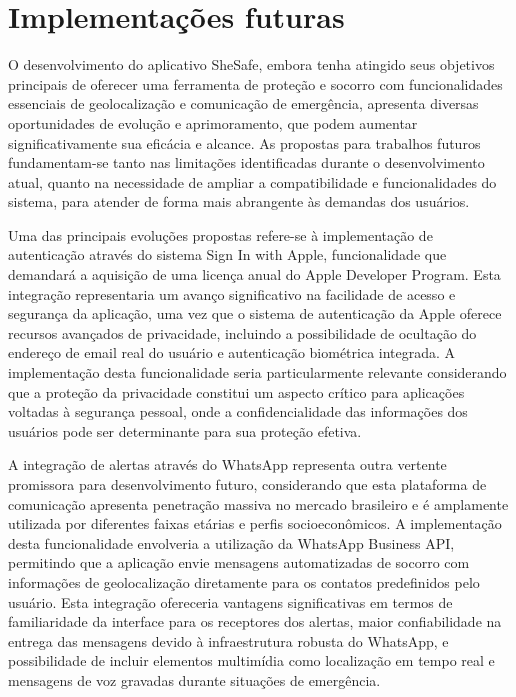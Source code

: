 \chapter{Implementações futuras}

O desenvolvimento do aplicativo SheSafe, embora tenha atingido seus objetivos principais de oferecer uma ferramenta de proteção e socorro com funcionalidades essenciais de geolocalização e comunicação de emergência, apresenta diversas oportunidades de evolução e aprimoramento, que podem aumentar significativamente sua eficácia e alcance. As propostas para trabalhos futuros fundamentam-se tanto nas limitações identificadas durante o desenvolvimento atual, quanto na necessidade de ampliar a compatibilidade e funcionalidades do sistema, para atender de forma mais abrangente às demandas dos usuários.

Uma das principais evoluções propostas refere-se à implementação de autenticação através do sistema Sign In with Apple, funcionalidade que demandará a aquisição de uma licença anual do Apple Developer Program. Esta integração representaria um avanço significativo na facilidade de acesso e segurança da aplicação, uma vez que o sistema de autenticação da Apple oferece recursos avançados de privacidade, incluindo a possibilidade de ocultação do endereço de email real do usuário e autenticação biométrica integrada. A implementação desta funcionalidade seria particularmente relevante considerando que a proteção da privacidade constitui um aspecto crítico para aplicações voltadas à segurança pessoal, onde a confidencialidade das informações dos usuários pode ser determinante para sua proteção efetiva.

A integração de alertas através do WhatsApp representa outra vertente promissora para desenvolvimento futuro, considerando que esta plataforma de comunicação apresenta penetração massiva no mercado brasileiro e é amplamente utilizada por diferentes faixas etárias e perfis socioeconômicos. A implementação desta funcionalidade envolveria a utilização da WhatsApp Business API, permitindo que a aplicação envie mensagens automatizadas de socorro com informações de geolocalização diretamente para os contatos predefinidos pelo usuário. Esta integração ofereceria vantagens significativas em termos de familiaridade da interface para os receptores dos alertas, maior confiabilidade na entrega das mensagens devido à infraestrutura robusta do WhatsApp, e possibilidade de incluir elementos multimídia como localização em tempo real e mensagens de voz gravadas durante situações de emergência.

